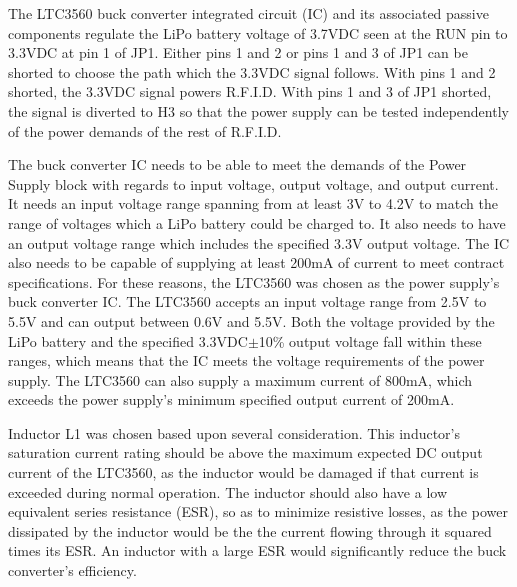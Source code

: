 The LTC3560 buck converter integrated circuit (IC) and its associated passive components regulate the LiPo battery voltage of 3.7VDC seen at the RUN pin to 3.3VDC at pin 1 of JP1. Either pins 1 and 2 or pins 1 and 3 of JP1 can be shorted to choose the path which the 3.3VDC signal follows. With pins 1 and 2 shorted, the 3.3VDC signal powers R.F.I.D. With pins 1 and 3 of JP1 shorted, the signal is diverted to H3 so that the power supply can be tested independently of the power demands of the rest of R.F.I.D. 

The buck converter IC needs to be able to meet the demands of the Power Supply block with regards to input voltage, output voltage, and output current. It needs an input voltage range spanning from at least 3V to 4.2V to match the range of voltages which a LiPo battery could be charged to. It also needs to have an output voltage range which includes the specified 3.3V output voltage. The IC also needs to be capable of supplying at least 200mA of current to meet contract specifications. For these reasons, the LTC3560 was chosen as the power supply's buck converter IC. The LTC3560 accepts an input voltage range from 2.5V to 5.5V and can output between 0.6V and 5.5V. Both the voltage provided by the LiPo battery and the specified 3.3VDC$\pm$10\% output voltage fall within these ranges, which means that the IC meets the voltage requirements of the power supply. The LTC3560 can also supply a maximum current of 800mA, which exceeds the power supply's minimum specified output current of 200mA.


Inductor L1 was chosen based upon several consideration. This inductor's saturation current rating should be above the maximum expected DC output current of the LTC3560, as the inductor would be damaged if that current is exceeded during normal operation. The inductor should also have a low equivalent series resistance (ESR), so as to minimize resistive losses, as the power dissipated by the inductor would be the the current flowing through it squared times its ESR. An inductor with a large ESR would significantly reduce the buck converter's efficiency.

